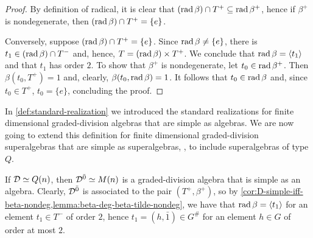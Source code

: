 \begin{proof}
    By definition of radical, it is clear that $(\operatorname{rad} \beta) \cap T^+ \subseteq \operatorname{rad} \beta^+$, hence if $\beta^+$ is nondegenerate, then $(\operatorname{rad} \beta) \cap T^+ = \{e\}$. 
    
    Conversely, suppose $(\operatorname{rad} \beta) \cap T^+ = \{e\}$. 
    Since $\operatorname{rad}\beta \neq \{e\}$, there is $t_1 \in (\operatorname{rad} \beta) \cap T^-$ and, hence, $T = (\operatorname{rad}\beta) \times T^+$. 
    We conclude that $\operatorname{rad} \beta = \langle t_1 \rangle$ and that $t_1$ has order $2$. 
    To show that $\beta^+$ is nondegenerate, let $t_0 \in \operatorname{rad} \beta^+$. 
    Then $\beta(t_0, T^+) = 1$ and, clearly, $\beta(t_0, \operatorname{rad} \beta) = 1$. 
    It follows that $t_0 \in \operatorname{rad} \beta$ and, since $t_0 \in T^+$, $t_0 = \{e\}$, concluding the proof. 
\end{proof}


In \cref{def:standard-realization} we introduced the standard realizations for finite dimensional graded-division algebras that are simple as algebras. 
We are now going to extend this definition for finite dimensional graded-division superalgebras that are simple as superalgebras, \ie, to include superalgebras of type $Q$. 

If $\mathcal{D} \simeq Q(n)$, then $\mathcal{D}^{\bar0} \simeq M(n)$ is a graded-division algebra that is simple as an algebra. 
Clearly, $\mathcal{D}^{\bar0}$ is associated to the pair $(T^+, \beta^+)$, so by \cref{cor:D-simple-iff-beta-nondeg,lemma:beta-deg-beta-tilde-nondeg}, we have that $\operatorname{rad} \beta = \langle t_1 \rangle$ for an element $t_1\in T^-$ of order $2$, hence $t_1 = (h, \bar 1) \in G^\#$ for an element $h \in G$ of order at most $2$. 

